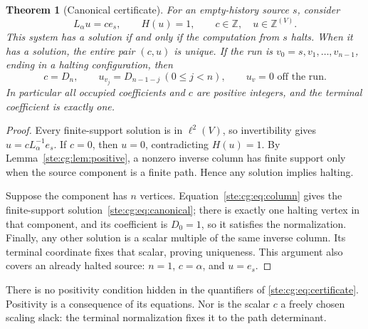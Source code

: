 \documentclass[11pt,letterpaper]{article}
\newtheorem{theorem}{Theorem}[section]
\theoremstyle{definition}
\theoremstyle{remark}
\newcommand{\Z}{\mathbb Z}
\begin{document}
\begin{theorem}[Canonical certificate]\label{ste:cg:thm:canonical}
For an empty-history source $s$, consider
\begin{equation}\label{ste:cg:eq:certificate}
 L_\alpha u=c e_s,\qquad H(u)=1,
 \qquad c\in\Z,\quad u\in\Z^{(V)}.
\end{equation}
This system has a solution if and only if the computation from $s$ halts.
When it has a solution, the entire pair $(c,u)$ is unique. If the run is
$v_0=s,v_1,\ldots,v_{n-1}$, ending in a halting configuration, then
\begin{equation}\label{ste:cg:eq:canonical}
 c=D_n,\qquad u_{v_j}=D_{n-1-j}\ (0\le j<n),\qquad
 u_v=0\text{ off the run}.
\end{equation}
In particular all occupied coefficients and $c$ are positive integers,
and the terminal coefficient is exactly one.
\end{theorem}
\begin{proof}
Every finite-support solution is in $\ell^2(V)$, so invertibility gives
$u=cL_\alpha^{-1}e_s$. If $c=0$, then $u=0$, contradicting $H(u)=1$.
By Lemma~\ref{ste:cg:lem:positive}, a nonzero inverse column has finite support
only when the source component is a finite path. Hence any solution
implies halting.

Suppose the component has $n$ vertices. Equation~\eqref{ste:cg:eq:column} gives
the finite-support solution~\eqref{ste:cg:eq:canonical}; there is exactly one
halting vertex in that component, and its coefficient is $D_0=1$, so it
satisfies the normalization. Finally, any other solution is a scalar
multiple of the same inverse column. Its terminal coordinate fixes that
scalar, proving uniqueness. This argument also covers an already halted
source: $n=1$, $c=\alpha$, and $u=e_s$.
\end{proof}

There is no positivity condition hidden in the quantifiers of
\eqref{ste:cg:eq:certificate}. Positivity is a consequence of its equations.
Nor is the scalar $c$ a freely chosen scaling slack: the terminal
normalization fixes it to the path determinant.
\end{document}

